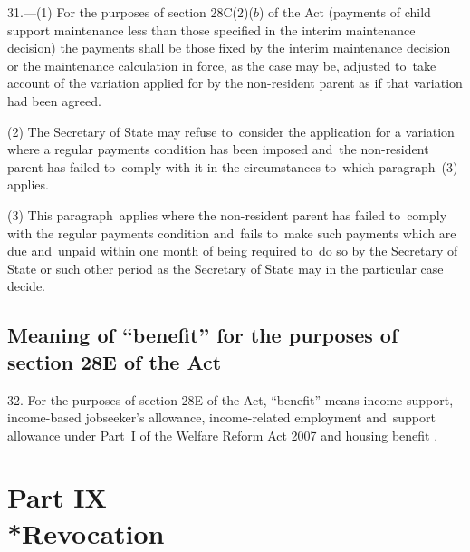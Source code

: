\documentclass[12pt,a4paper]{article}
\begin{document}
\renewcommand\parthead{--- Part VIII}

31.---(1)  For the purposes of section 28C(2)($b$)  of the Act (payments of child support maintenance less than those specified in the interim maintenance decision) the payments shall be those fixed by the interim maintenance decision or the maintenance calculation in force, as the case may be, adjusted to~take account of the variation applied for by the non-resident parent as if that variation had been agreed.

(2) The Secretary of State may refuse to~consider the application for a variation where a regular payments condition has been imposed and~the non-resident parent has failed to~comply with it in the circumstances to~which paragraph~(3) applies.

(3) This paragraph~applies where the non-resident parent has failed to~comply with the regular payments condition and~fails to~make such payments which are due and~unpaid within one month of being required to~do so by the Secretary of State or such other period as the Secretary of State may in the particular case decide.

\subsection[32. Meaning of “benefit” for the purposes of section 28E of the Act]{Meaning of “benefit” for the purposes of section 28E of the Act}

32.  For the purposes of section 28E of the Act, “benefit” means income support, income-based jobseeker’s allowance, 
income-related employment and~support allowance under Part~I of the Welfare Reform Act 2007
and housing benefit%
.


\section[Part IX --- Revocation]{Part IX\\*Revocation}
\end{document}
